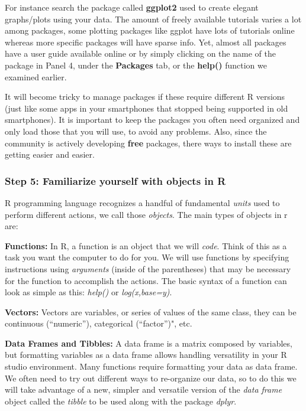 \documentclass[]{article}
\begin{document}
For instance search the package called \textbf{ggplot2} used to create
elegant graphs/plots using your data. The amount of freely available
tutorials varies a lot among packages, some plotting packages like
ggplot have lots of tutorials online whereas more specific packages will
have sparse info. Yet, almost all packages have a user guide available
online or by simply clicking on the name of the package in Panel 4,
under the \textbf{Packages} tab, or the \textbf{help()} function we
examined earlier.

It will become tricky to manage packages if these require different R
versions (just like some apps in your smartphones that stopped being
supported in old smartphones). It is important to keep the packages you
often need organized and only load those that you will use, to avoid any
problems. Also, since the community is actively developing \textbf{free}
packages, there ways to install these are getting easier and easier.

\hypertarget{step-5-familiarize-yourself-with-objects-in-r}{%
\subsubsection{Step 5: Familiarize yourself with objects in
R}\label{step-5-familiarize-yourself-with-objects-in-r}}

R programming language recognizes a handful of fundamental \emph{units}
used to perform different actions, we call those \emph{objects}. The
main types of objects in r are:

\textbf{Functions:} In R, a function is an object that we will
\emph{code}. Think of this as a task you want the computer to do for
you. We will use functions by specifying instructions using
\emph{arguments} (inside of the parentheses) that may be necessary for
the function to accomplish the actions. The basic syntax of a function
can look as simple as this: \emph{help()} or \emph{log(x,base=y)}.

\textbf{Vectors:} Vectors are variables, or series of values of the same
class, they can be continuous (``numeric''), categorical (``factor'')",
etc.

\textbf{Data Frames and Tibbles:} A data frame is a matrix composed by
variables, but formatting variables as a data frame allows handling
versatility in your R studio environment. Many functions require
formatting your data as data frame. We often need to try out different
ways to re-organize our data, so to do this we will take advantage of a
new, simpler and versatile version of the \emph{data frame} object
called the \emph{tibble} to be used along with the package \emph{dplyr}.
\end{document}
